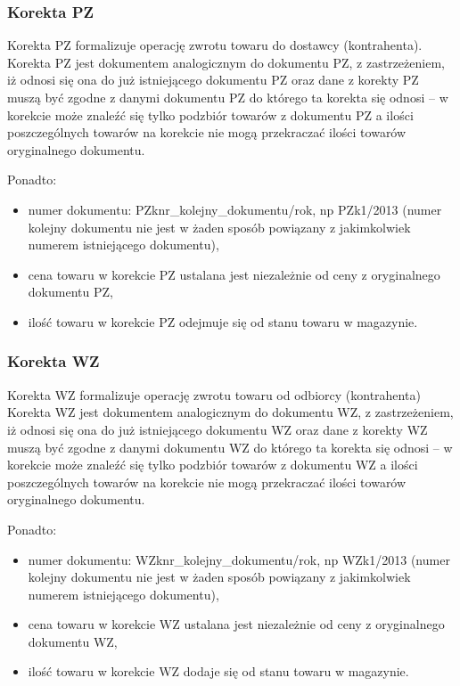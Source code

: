 \subsubsection{Korekta PZ}
Korekta PZ formalizuje operację zwrotu towaru do dostawcy
(kontrahenta).  Korekta PZ jest dokumentem analogicznym do dokumentu
PZ, z zastrzeżeniem, iż odnosi się ona do już istniejącego dokumentu
PZ oraz dane z korekty PZ muszą być zgodne z danymi dokumentu PZ do
którego ta korekta się odnosi -- w korekcie może znaleźć się tylko
podzbiór towarów z dokumentu PZ a ilości poszczególnych towarów na
korekcie nie mogą przekraczać ilości towarów oryginalnego dokumentu.

Ponadto:
\begin{itemize}
\item numer dokumentu: PZknr\_kolejny\_dokumentu/rok, np PZk1/2013
  (numer kolejny dokumentu nie jest w żaden sposób powiązany z
  jakimkolwiek numerem istniejącego dokumentu),
\item cena towaru w korekcie PZ ustalana jest niezależnie od ceny z
  oryginalnego dokumentu PZ,
\item ilość towaru w korekcie PZ odejmuje się od stanu towaru w
  magazynie.
\end{itemize}

\subsubsection{Korekta WZ}
Korekta WZ formalizuje operację zwrotu towaru od odbiorcy
(kontrahenta) Korekta WZ jest dokumentem analogicznym do dokumentu WZ,
z zastrzeżeniem, iż odnosi się ona do już istniejącego dokumentu WZ
oraz dane z korekty WZ muszą być zgodne z danymi dokumentu WZ do
którego ta korekta się odnosi -- w korekcie może znaleźć się tylko
podzbiór towarów z dokumentu WZ a ilości poszczególnych towarów na
korekcie nie mogą przekraczać ilości towarów oryginalnego dokumentu.

Ponadto:
\begin{itemize}
\item numer dokumentu: WZknr\_kolejny\_dokumentu/rok, np WZk1/2013
  (numer kolejny dokumentu nie jest w żaden sposób powiązany z
  jakimkolwiek numerem istniejącego dokumentu),
\item cena towaru w korekcie WZ ustalana jest niezależnie od ceny z
  oryginalnego dokumentu WZ,
\item ilość towaru w korekcie WZ dodaje się od stanu towaru w
  magazynie.
\end{itemize}

